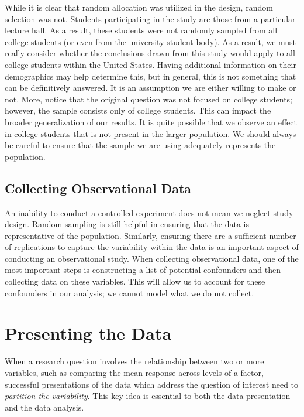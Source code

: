 \documentclass[]{book}
\theoremstyle{plain}
\theoremstyle{mydefn}
\theoremstyle{myexmpl}
\theoremstyle{remark}
\begin{document}
While it is clear that random allocation was utilized in the design,
random selection was not. Students participating in the study are those
from a particular lecture hall. As a result, these students were not
randomly sampled from all college students (or even from the university
student body). As a result, we must really consider whether the
conclusions drawn from this study would apply to all college students
within the United States. Having additional information on their
demographics may help determine this, but in general, this is not
something that can be definitively answered. It is an assumption we are
either willing to make or not. More, notice that the original question
was not focused on college students; however, the sample consists only
of college students. This can impact the broader generalization of our
results. It is quite possible that we observe an effect in college
students that is not present in the larger population. We should always
be careful to ensure that the sample we are using adequately represents
the population.

\section{Collecting Observational
Data}\label{collecting-observational-data}

An inability to conduct a controlled experiment does not mean we neglect
study design. Random sampling is still helpful in ensuring that the data
is representative of the population. Similarly, ensuring there are a
sufficient number of replications to capture the variability within the
data is an important aspect of conducting an observational study. When
collecting observational data, one of the most important steps is
constructing a list of potential confounders and then collecting data on
these variables. This will allow us to account for these confounders in
our analysis; we cannot model what we do not collect.

\chapter{Presenting the Data}\label{ANOVAsummaries}

When a research question involves the relationship between two or more
variables, such as comparing the mean response across levels of a
factor, successful presentations of the data which address the question
of interest need to \emph{partition the variability}. This key idea is
essential to both the data presentation and the data analysis.
\end{document}
